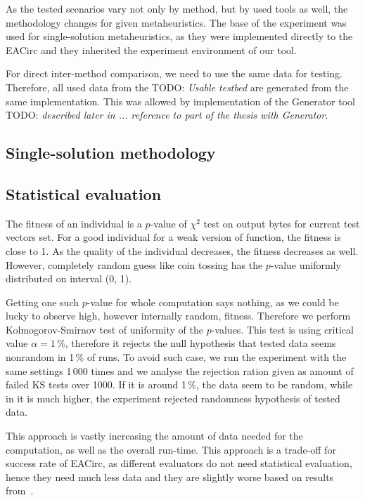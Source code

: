 \documentclass[
  print, %
  Table,   %
  nolof,     %
  nolot,     %
  11pt, %
  oneside  %
]{fithesis3}
\newcommand{\todo}[1]{TODO: \textit{#1}}
\begin{document}
As the tested scenarios vary not only by method, but by used tools as well, the methodology changes for given metaheuristics. The base of the experiment was used for single-solution metaheuristics, as they were implemented directly to the EACirc and they inherited the experiment environment of our tool.

For direct inter-method comparison, we need to use the same data for testing. Therefore, all used data from the \todo{Usable testbed} are generated from the same implementation. This was allowed by implementation of the Generator tool \todo{described later in ... reference to part of the thesis with Generator}.

\subsection{Single-solution methodology}

\subsection{Statistical evaluation}

The fitness of an individual is a $p$-value of $\chi^{2}$ test on output bytes for current test vectors set. For a good individual for a weak version of function, the fitness is close to 1. As the quality of the individual decreases, the fitness decreases as well. However, completely random guess like coin tossing has the $p$-value uniformly distributed on interval (0, 1).

Getting one such $p$-value for whole computation says nothing, as we could be lucky to observe high, however internally random, fitness. Therefore we perform Kolmogorov-Smirnov test of uniformity of the $p$-values. This test is using critical value $\alpha = 1\,\%$, therefore it rejects the null hypothesis that tested data seems nonrandom in 1\,\% of runs. To avoid such case, we run the experiment with the same settings 1\,000 times and we analyse the rejection ration given as amount of failed KS tests over 1000. If it is around 1\,\%, the data seem to be random, while in it is much higher, the experiment rejected randomness hypothesis of tested data.

This approach is vastly increasing the amount of data needed for the computation, as well as the overall run-time. This approach is a trade-off for success rate of EACirc, as different evaluators do not need statistical evaluation, hence they need much less data and they are slightly worse based on results from~\cite{svenda2013towards}.
\end{document}

